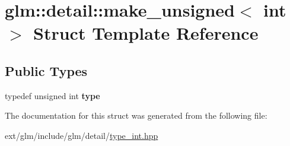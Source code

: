 \hypertarget{structglm_1_1detail_1_1make__unsigned_3_01int_01_4}{\section{glm\-:\-:detail\-:\-:make\-\_\-unsigned$<$ int $>$ Struct Template Reference}
\label{structglm_1_1detail_1_1make__unsigned_3_01int_01_4}
}
\subsection*{Public Types}
\begin{DoxyCompactItemize}
\item 
\hypertarget{structglm_1_1detail_1_1make__unsigned_3_01int_01_4_ac3fd57ed35c0305bbe941009a84139c1}{typedef unsigned int {\bfseries type}}\label{structglm_1_1detail_1_1make__unsigned_3_01int_01_4_ac3fd57ed35c0305bbe941009a84139c1}

\end{DoxyCompactItemize}


The documentation for this struct was generated from the following file\-:\begin{DoxyCompactItemize}
\item 
ext/glm/include/glm/detail/\hyperlink{type__int_8hpp}{type\-\_\-int.\-hpp}\end{DoxyCompactItemize}
